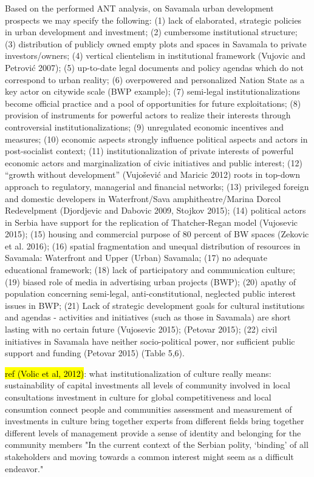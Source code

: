 \documentclass[11pt]{report}
\begin{document}
Based on the performed ANT analysis, on Savamala urban development prospects we may specify the following: (1) lack of elaborated, strategic policies in urban development and investment; (2) cumbersome institutional structure; (3) distribution of publicly owned empty plots and spaces in Savamala to private investors/owners; (4) vertical clientelism in institutional framework (Vujovic and Petrović 2007); (5) up-to-date legal documents and policy agendas which do not correspond to urban reality; (6) overpowered and personalized Nation State as a key actor on citywide scale (BWP example); (7) semi-legal institutionalizations become official practice and a pool of opportunities for future exploitations; (8) provision of instruments for powerful actors to realize their interests through controversial institutionalizations; (9) unregulated economic incentives and measures; (10) economic aspects strongly influence political aspects and actors in post-socialist context; (11) institutionalization of private interests of powerful economic actors and marginalization of civic initiatives and public interest; (12) “growth without development” (Vujošević and Maricic 2012) roots in top-down approach to regulatory, managerial and financial networks; (13) privileged foreign and domestic developers in Waterfront/Sava amphitheatre/Marina Dorcol Redevelpment (Djordjevic and Dabovic 2009, Stojkov 2015); (14) political actors in Serbia have support for the replication of Thatcher-Regan model (Vujosevic 2015); (15) housing and commercial purpose of 80 percent of BW spaces (Zekovic et al. 2016);  (16) spatial fragmentation and unequal distribution of resources in Savamala: Waterfront and Upper (Urban) Savamala; (17) no adequate educational framework; (18) lack of participatory and communication culture; (19) biased role of media in advertising urban projects (BWP); (20) apathy of population concerning semi-legal, anti-constitutional, neglected public interest issues in BWP; (21) Lack of strategic development goals for cultural institutions and agendas - activities and initiatives (such as those in Savamala) are short lasting with no certain future (Vujosevic 2015); (Petovar 2015); (22) civil initiatives in Savamala have neither socio-political power, nor sufficient public support and funding (Petovar 2015) (Table 5,6). 

\hl{ref (Volic et al, 2012)}:
what institutionalization of culture really means:
    sustainability of capital investments
    all levels of community involved in local consultations
    investment in culture for global competitiveness and local consumtion
    connect people and communities
    assessment and measurement of investments in culture
    bring together experts from different fields
    bring together different levels of management
    provide a sense of identity and belonging for the community members
"In the current context  of  the  Serbian  polity,  ‘binding’  of  all stakeholders  and  moving  towards  a  common interest  might  seem  as  a  difficult  endeavor."
\end{document}
